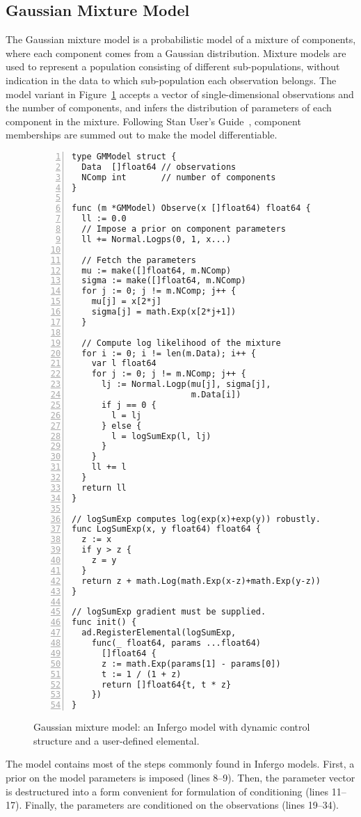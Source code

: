 \documentclass[sigplan,10pt,screen]{acmart}
\begin{document}
\begin{sloppypar}
\subsection{Gaussian Mixture Model}
\label{sec:gaussian-mixture}

The Gaussian mixture model is a probabilistic model of a mixture
of components, where each component comes from a Gaussian
distribution. Mixture models are used to represent a population
consisting of different sub-populations, without indication in
the data to which sub-population each observation belongs. The
model variant in Figure~\ref{fig:gaussian-mixture} accepts a
vector of single-dimensional observations and the number of
components, and infers the distribution of parameters of each
component in the mixture. Following Stan User's
Guide~\cite{SDT18}, component memberships are summed out to make
the model differentiable.
\begin{figure}
\begin{lstlisting}[framexleftmargin=10pt,numbers=left]
type GMModel struct {
  Data  []float64 // observations
  NComp int       // number of components
}

func (m *GMModel) Observe(x []float64) float64 {
  ll := 0.0
  // Impose a prior on component parameters
  ll += Normal.Logps(0, 1, x...)

  // Fetch the parameters
  mu := make([]float64, m.NComp)
  sigma := make([]float64, m.NComp)
  for j := 0; j != m.NComp; j++ {
    mu[j] = x[2*j]
    sigma[j] = math.Exp(x[2*j+1])
  }

  // Compute log likelihood of the mixture
  for i := 0; i != len(m.Data); i++ {
    var l float64
    for j := 0; j != m.NComp; j++ {
      lj := Normal.Logp(mu[j], sigma[j],
                        m.Data[i])
      if j == 0 {
        l = lj
      } else {
        l = logSumExp(l, lj)
      }
    }
    ll += l
  }
  return ll
}

// logSumExp computes log(exp(x)+exp(y)) robustly.
func LogSumExp(x, y float64) float64 {
  z := x
  if y > z {
    z = y
  }
  return z + math.Log(math.Exp(x-z)+math.Exp(y-z))
}

// logSumExp gradient must be supplied.
func init() {
  ad.RegisterElemental(logSumExp,
    func(_ float64, params ...float64)
      []float64 {
      z := math.Exp(params[1] - params[0])
      t := 1 / (1 + z)
      return []float64{t, t * z}
    })
}
\end{lstlisting}
\caption{Gaussian mixture model: an Infergo model with
  dynamic control structure and a user-defined elemental.}
\label{fig:gaussian-mixture}
\end{figure}
The model contains most of the steps commonly found in Infergo
models. First, a prior on the model parameters is imposed (lines
8--9). Then, the parameter vector is destructured into a form
convenient for formulation of conditioning (lines 11--17).
Finally, the parameters are conditioned on the observations
(lines 19--34).


\end{sloppypar}
\end{document}

